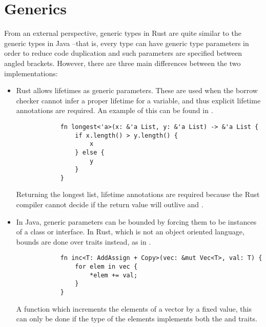 \section{Generics}
\label{sec:generics}

From an external perspective, generic types in Rust are quite similar to the
generic types in Java --that is, every type can have generic type parameters in
order to reduce code duplication and such parameters are specified between
angled brackets. However, there are three main differences between the two
implementations:

\begin{itemize}
    \item Rust allows lifetimes as generic parameters. These are used when the
        borrow checker cannot infer a proper lifetime for a variable, and thus
        explicit lifetime annotations are required. An example of this can be
        found in .
  
        \begin{listing}[h]
            \begin{verbatim}
            fn longest<'a>(x: &'a List, y: &'a List) -> &'a List {
                if x.length() > y.length() {
                    x
                } else {
                    y
                }
            }
            \end{verbatim}
            \caption{Returning the longest list, lifetime annotations are required
            because the Rust compiler cannot decide if the return value will outlive
         and .}
          \label{lst:gen_lifetimes}
        \end{listing}
    
    \item In Java, generic parameters can be bounded by forcing them to be
        instances of a class or interface. In Rust, which is not an object
        oriented language, bounds are done over traits instead, as in
        .
  
        \begin{listing}[h]
            \begin{verbatim}
            fn inc<T: AddAssign + Copy>(vec: &mut Vec<T>, val: T) {
                for elem in vec {
                    *elem += val;
                }
            }
            \end{verbatim}
            \caption{A function which increments the elements of a vector by a fixed
                value, this can only be done if the type of the elements 
                implements both the  and  traits.}
          \label{lst:bounds}
        \end{listing}


\end{itemize}
